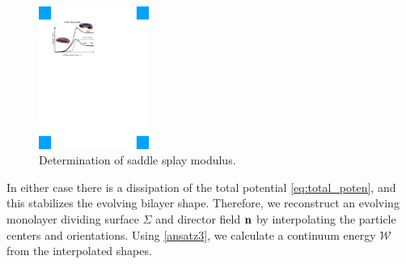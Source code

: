 \begin{figure}
\centerline{\includegraphics[width=0.32\textwidth]{Figures/SaddleSplayDiagram.pdf}}
\caption{\label{fig:saddle_splay} \footnotesize Determination of
  saddle splay modulus.}
\end{figure}
%
In either case there is a dissipation of the total potential \eqref{eq:total_poten}, and this stabilizes the evolving bilayer shape.
Therefore, we reconstruct an evolving monolayer dividing surface $\Sigma$ and director field ${\bf n}$ by
interpolating the particle centers and orientations. Using \eqref{ansatz3}, we calculate a continuum energy $\mathcal{W}$ from the interpolated shapes.


%
%

